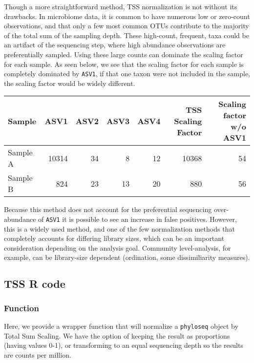 \documentclass[
]{book}
\begin{document}
Though a more straightforward method, TSS normalization is not without its drawbacks. In microbiome data, it is common to have numerous low or zero-count observations, and that only a few most common OTUs contribute to the majority of the total sum of the sampling depth. These high-count, frequent, taxa could be an artifact of the sequencing step, where high abundance observations are preferentially sampled. Using these large counts can dominate the scaling factor for each sample. As seen below, we see that the scaling factor for each sample is completely dominated by \texttt{ASV1}, if that one taxon were not included in the sample, the scaling factor would be widely different.

\begin{tabular}{l|r|r|r|r|r|r}
\hline
Sample & ASV1 & ASV2 & ASV3 & ASV4 & TSS Scaling Factor & Scaling factor w/o ASV1\\
\hline
Sample A & 10314 & 34 & 8 & 12 & 10368 & 54\\
\hline
Sample B & 824 & 23 & 13 & 20 & 880 & 56\\
\hline
\end{tabular}

Because this method does not account for the preferential sequencing over-abundance of \texttt{ASV1} it is possible to see an increase in false positives. However, this is a widely used method, and one of the few normalization methods that completely accounts for differing library sizes, which can be an important consideration depending on the analysis goal. Community level-analysis, for example, can be library-size dependent (ordination, some dissimiliarity measures).

\hypertarget{tss-r-code}{%
\subsection{TSS R code}\label{tss-r-code}}

\hypertarget{function}{%
\subsubsection{Function}\label{function}}

Here, we provide a wrapper function that will normalize a \texttt{phyloseq} object by Total Sum Scaling. We have the option of keeping the result as proportions (having values 0-1), or transforming to an equal sequencing depth so the results are counts per million.
\end{document}
